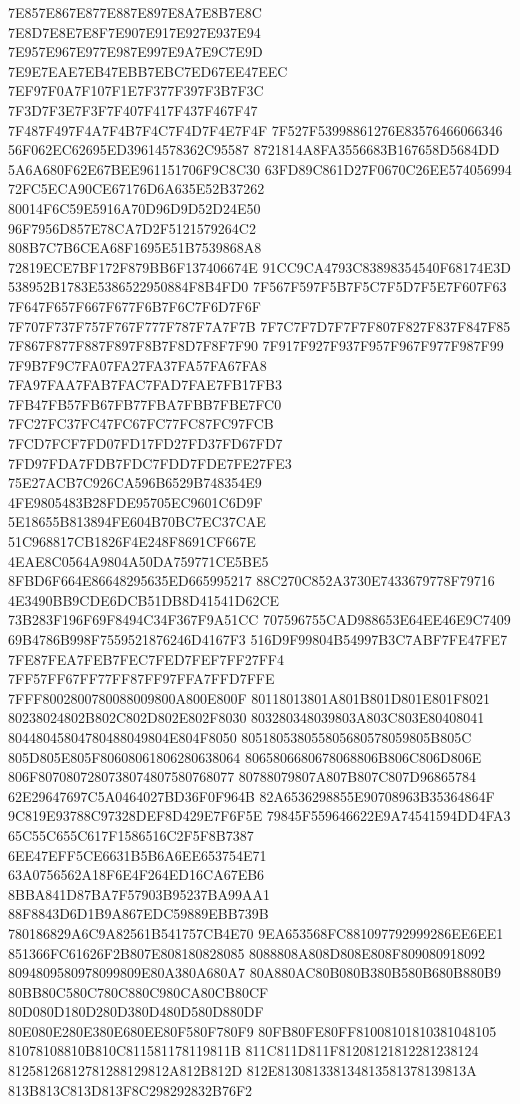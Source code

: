 7E857E867E877E887E897E8A7E8B7E8C
7E8D7E8E7E8F7E907E917E927E937E94
7E957E967E977E987E997E9A7E9C7E9D
7E9E7EAE7EB47EBB7EBC7ED67EE47EEC
7EF97F0A7F107F1E7F377F397F3B7F3C
7F3D7F3E7F3F7F407F417F437F467F47
7F487F497F4A7F4B7F4C7F4D7F4E7F4F
7F527F53998861276E83576466066346
56F062EC62695ED39614578362C95587
8721814A8FA3556683B167658D5684DD
5A6A680F62E67BEE961151706F9C8C30
63FD89C861D27F0670C26EE574056994
72FC5ECA90CE67176D6A635E52B37262
80014F6C59E5916A70D96D9D52D24E50
96F7956D857E78CA7D2F5121579264C2
808B7C7B6CEA68F1695E51B7539868A8
72819ECE7BF172F879BB6F137406674E
91CC9CA4793C83898354540F68174E3D
538952B1783E5386522950884F8B4FD0
7F567F597F5B7F5C7F5D7F5E7F607F63
7F647F657F667F677F6B7F6C7F6D7F6F
7F707F737F757F767F777F787F7A7F7B
7F7C7F7D7F7F7F807F827F837F847F85
7F867F877F887F897F8B7F8D7F8F7F90
7F917F927F937F957F967F977F987F99
7F9B7F9C7FA07FA27FA37FA57FA67FA8
7FA97FAA7FAB7FAC7FAD7FAE7FB17FB3
7FB47FB57FB67FB77FBA7FBB7FBE7FC0
7FC27FC37FC47FC67FC77FC87FC97FCB
7FCD7FCF7FD07FD17FD27FD37FD67FD7
7FD97FDA7FDB7FDC7FDD7FDE7FE27FE3
75E27ACB7C926CA596B6529B748354E9
4FE9805483B28FDE95705EC9601C6D9F
5E18655B813894FE604B70BC7EC37CAE
51C968817CB1826F4E248F8691CF667E
4EAE8C0564A9804A50DA759771CE5BE5
8FBD6F664E86648295635ED665995217
88C270C852A3730E7433679778F79716
4E3490BB9CDE6DCB51DB8D41541D62CE
73B283F196F69F8494C34F367F9A51CC
707596755CAD988653E64EE46E9C7409
69B4786B998F7559521876246D4167F3
516D9F99804B54997B3C7ABF7FE47FE7
7FE87FEA7FEB7FEC7FED7FEF7FF27FF4
7FF57FF67FF77FF87FF97FFA7FFD7FFE
7FFF8002800780088009800A800E800F
80118013801A801B801D801E801F8021
80238024802B802C802D802E802F8030
803280348039803A803C803E80408041
80448045804780488049804E804F8050
805180538055805680578059805B805C
805D805E805F80608061806280638064
8065806680678068806B806C806D806E
806F8070807280738074807580768077
80788079807A807B807C807D96865784
62E29647697C5A0464027BD36F0F964B
82A6536298855E90708963B35364864F
9C819E93788C97328DEF8D429E7F6F5E
79845F559646622E9A74541594DD4FA3
65C55C655C617F1586516C2F5F8B7387
6EE47EFF5CE6631B5B6A6EE653754E71
63A0756562A18F6E4F264ED16CA67EB6
8BBA841D87BA7F57903B95237BA99AA1
88F8843D6D1B9A867EDC59889EBB739B
780186829A6C9A82561B541757CB4E70
9EA653568FC881097792999286EE6EE1
851366FC61626F2B807E808180828085
8088808A808D808E808F809080918092
8094809580978099809E80A380A680A7
80A880AC80B080B380B580B680B880B9
80BB80C580C780C880C980CA80CB80CF
80D080D180D280D380D480D580D880DF
80E080E280E380E680EE80F580F780F9
80FB80FE80FF81008101810381048105
81078108810B810C811581178119811B
811C811D811F81208121812281238124
81258126812781288129812A812B812D
812E813081338134813581378139813A
813B813C813D813F8C298292832B76F2
